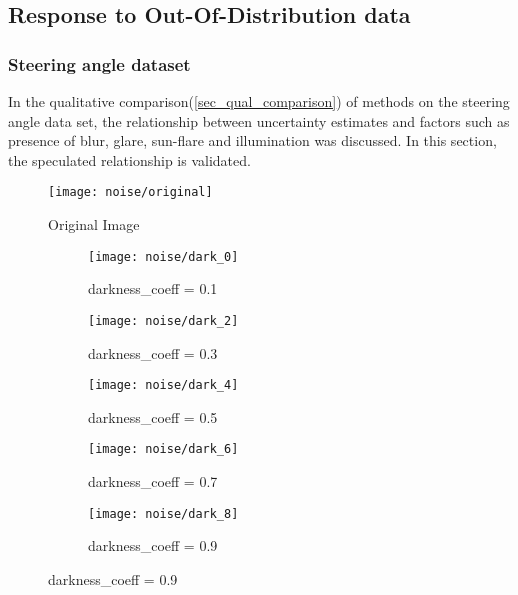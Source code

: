 \subsection {Response to Out-Of-Distribution data}\label{subsec_ood}
\subsubsection{Steering angle dataset}
In the qualitative comparison(\ref{sec_qual_comparison}) of methods on the steering angle data set, the relationship between uncertainty estimates and factors such as presence of blur, glare, sun-flare and illumination was discussed. In this section, the speculated relationship is validated. 
\begin{figure}[H]
	\centering
	\texttt{[image: noise/original]}
	\caption{Original Image}
	\label{fig_original_noise}
	\hfill
\end{figure}
\begin{figure}[H]
	\centering
	\begin{subfigure}[b]{0.18\textwidth}
		\centering
		\texttt{[image: noise/dark\_0]}
		\caption{darkness\_coeff = 0.1}
		\label{mcdo_fn2}
	\end{subfigure}
	\hfill
	\begin{subfigure}[b]{0.18\textwidth}
		\centering
		\texttt{[image: noise/dark\_2]}
		\caption{darkness\_coeff = 0.3}
		\label{der_fn2}
	\end{subfigure}
	\hfill
	\begin{subfigure}[b]{0.18\textwidth}
		\centering
		\texttt{[image: noise/dark\_4]}
		\caption{darkness\_coeff = 0.5}
		\label{homo_fn3}
	\end{subfigure}
	\hfill
	\begin{subfigure}[b]{0.18\textwidth}
		\centering
		\texttt{[image: noise/dark\_6]}
		\caption{darkness\_coeff = 0.7}
		\label{hetero_fn3}
	\end{subfigure}
	\hfill
	\begin{subfigure}[b]{0.18\textwidth}
		\centering
		\texttt{[image: noise/dark\_8]}
		\caption{darkness\_coeff = 0.9}
		\label{mcdo_fn3}
	\end{subfigure}
	\hfill
	\label{fig_noise_dark}
\end{figure}
